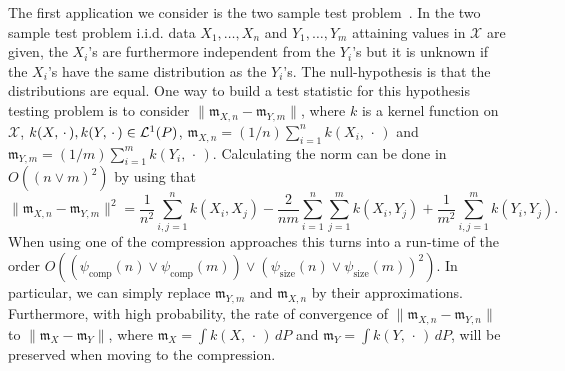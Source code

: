 \documentclass[AHL,Unicode,longabstracts,published]{cedram}
\theoremstyle{remark}
\newcommand{\compp}{\mathrm{comp}}
\newcommand{\ssize}{\mathrm{size}}
\newcommand{\X}{\mathcal{X}}
\newcommand{\clL}{\mathcal{L}}
\newcommand{\mean}{\mathfrak{m}}
\begin{document}
The first application we consider is the two sample test problem~\cite{GRET12}. In the two sample test problem i.i.d. data $X_1,\dots, X_n$ and $Y_1, \dots, Y_m$ attaining values in $\X$ are given, the $X_i$'s are furthermore independent from the $Y_i$'s but it is unknown if the $X_i$'s have the same distribution as the $Y_i$'s. The null-hypothesis is that the distributions are equal. One way to build a test statistic for this hypothesis testing problem is to consider $\| \mean_{X,n} - \mean_{Y,m}\|$, where $k$ is a kernel function on $\X$, $k(X,\,\cdot\,),\linebreak k(Y,\,\cdot\,) \in \clL^1(P)$, $\mean_{X,n} = (1/n) \sum_{i=1}^n k(X_i,\,\cdot\,)$ and $\mean_{Y,m} = (1/m) \sum_{i=1}^m k(Y_i,\,\cdot\,)$. Calculating the norm can be done in $O((n\vee m)^2)$ by using that
\[
\|\mean_{X,n} - \mean_{Y,m}\|^2 = \frac{1}{n^2}\sum_{i,j=1}^n k(X_i,X_j) - \frac{2}{nm} \sum_{i=1}^n \sum_{j=1}^m k(X_i,Y_j) + \frac{1}{m^2} \sum_{i,j=1}^m k(Y_i,Y_j).
\]
When using one of the compression approaches this turns into a run-time of the order $O((\psi_{\compp}(n) \vee \psi_{\compp}(m)) \vee (\psi_{\ssize}(n) \vee \psi_{\ssize}(m))^2)$. In particular, we can simply replace $\mean_{Y,m}$ and $\mean_{X,n}$ by their approximations. Furthermore, with high probability, the rate of convergence of $\|\mean_{X,n} - \mean_{Y,n}\|$ to $\|\mean_X - \mean_Y\|$, where $\mean_X = \int k(X,\,\cdot\,) \, dP$ and $\mean_Y = \int k(Y,\,\cdot\,) \, dP$, will be preserved when moving to the compression.
\end{document}
